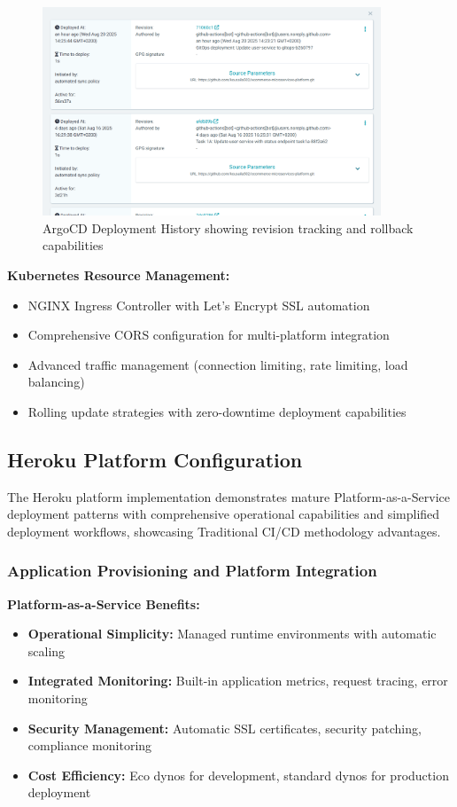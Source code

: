 \begin{figure}[H]
\centering
\includegraphics[width=0.9\textwidth]{figures/chapter5/argocd-deployment-history.png}
\caption{ArgoCD Deployment History showing revision tracking and rollback capabilities}
\label{fig:argocd-deployment-history}
\end{figure}


\textbf{Kubernetes Resource Management:}
\begin{itemize}
\item NGINX Ingress Controller with Let's Encrypt SSL automation
\item Comprehensive CORS configuration for multi-platform integration
\item Advanced traffic management (connection limiting, rate limiting, load balancing)
\item Rolling update strategies with zero-downtime deployment capabilities
\end{itemize}

\subsection{Heroku Platform Configuration}

The Heroku platform implementation demonstrates mature Platform-as-a-Service deployment patterns with comprehensive operational capabilities and simplified deployment workflows, showcasing Traditional CI/CD methodology advantages.

\subsubsection{Application Provisioning and Platform Integration}



\textbf{Platform-as-a-Service Benefits:}
\begin{itemize}
\item \textbf{Operational Simplicity:} Managed runtime environments with automatic scaling
\item \textbf{Integrated Monitoring:} Built-in application metrics, request tracing, error monitoring
\item \textbf{Security Management:} Automatic SSL certificates, security patching, compliance monitoring
\item \textbf{Cost Efficiency:} Eco dynos for development, standard dynos for production deployment
\end{itemize}

